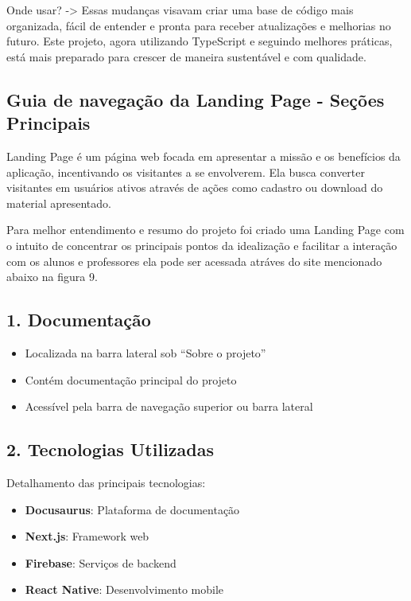 Onde usar?  ->  Essas mudanças visavam criar uma base de código mais organizada, fácil de entender e pronta para receber atualizações e melhorias no futuro. Este projeto, agora utilizando TypeScript e seguindo melhores práticas, está mais preparado para crescer de maneira sustentável e com qualidade.

\subsection{Guia de navegação da Landing Page - Seções Principais}

Landing Page é um página web focada em apresentar a missão e os benefícios da aplicação, incentivando os visitantes a se envolverem. Ela busca converter visitantes em usuários ativos através de ações como cadastro ou download do material apresentado.

Para melhor entendimento e resumo do projeto foi criado uma Landing Page com o intuito de concentrar os principais pontos da idealização e facilitar a interação com os alunos e professores ela pode ser acessada atráves do site mencionado abaixo na figura 9. 


\subsection{1. Documentação}
\begin{itemize}
    \item Localizada na barra lateral sob ``Sobre o projeto''
    \item Contém documentação principal do projeto
    \item Acessível pela barra de navegação superior ou barra lateral
\end{itemize}

\subsection{2. Tecnologias Utilizadas}
Detalhamento das principais tecnologias:
\begin{itemize}
    \item \textbf{Docusaurus}: Plataforma de documentação
    \item \textbf{Next.js}: Framework web
    \item \textbf{Firebase}: Serviços de backend
    \item \textbf{React Native}: Desenvolvimento mobile
\end{itemize}

